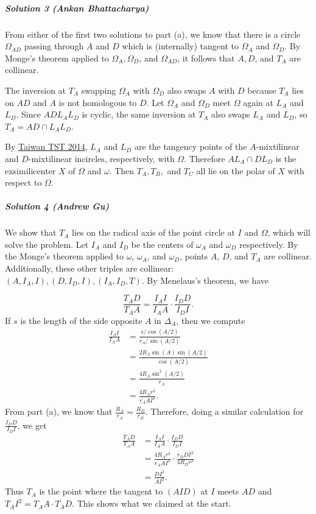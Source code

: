 \subparagraph{Solution 3 (Ankan Bhattacharya)}

From either of the first two solutions to part (a), we know that there is a
circle $\Omega_{AD}$ passing through $A$ and $D$ which is (internally) tangent
to $\Omega_A$ and $\Omega_D$. By Monge's theorem applied to $\Omega_A,
\Omega_D$, and $\Omega_{AD}$, it follows that $A, D$, and $T_A$ are collinear.

The inversion at $T_A$ swapping $\Omega_A$ with $\Omega_D$ also swaps $A$ with
$D$ because $T_A$ lies on $AD$ and $A$ is not homologous to $D$. Let $\Omega_A$
and $\Omega_D$ meet $\Omega$ again at $L_A$ and $L_D$. Since $ADL_AL_D$ is
cyclic, the same inversion at $T_A$ also swaps $L_A$ and $L_D$, so $T_A=AD\cap
L_AL_D$.

By \href{https://aops.com/community/c6h598547p3551881}{Taiwan TST
2014}, $L_A$ and $L_D$ are the tangency points of the $A$-mixtilinear and
$D$-mixtilinear incircles, respectively, with $\Omega$. Therefore $AL_A\cap
DL_D$ is the exsimilicenter $X$ of $\Omega$ and $\omega$. Then $T_A, T_B,$ and
$T_C$ all lie on the polar of $X$ with respect to $\Omega$.

\subparagraph{Solution 4 (Andrew Gu)}

We show that $T_A$ lies on the radical axis of the point circle at $I$ and
$\Omega$, which will solve the problem.  Let $I_A$ and $I_D$ be the centers of
$\omega_A$ and $\omega_D$ respectively. By the Monge's theorem applied to
$\omega$, $\omega_A$, and $\omega_D$, points $A$, $D$, and $T_A$ are collinear.
Additionally, these other triples are collinear: $(A, I_A, I), (D, I_D, I),
(I_A, I_D, T)$.  By Menelaus's theorem, we have

\[\frac{T_AD}{T_AA}=\frac{I_AI}{I_AA}\cdot\frac{I_DD}{I_DI}.\]
If $s$ is the length of the side opposite $A$ in $\Delta_A$, then we compute
\begin{align*}
  \frac{I_AI}{I_AA} &=\frac{s/\cos(A/2)}{r_A/\sin(A/2)} \\
                    &=\frac{2R_A\sin(A)\sin(A/2)}{\cos(A/2)} \\
                    &=\frac{4R_A\sin^2(A/2)}{r_A} \\
                    &=\frac{4R_Ar^2}{r_AAI^2}.
\end{align*}
From part (a), we know that $\frac{R_A}{r_A}=\frac{R_D}{r_D}$.
Therefore, doing a similar calculation for $\frac{I_DD}{I_DI}$, we get
\begin{align*}
  \frac{T_AD}{T_AA} &=\frac{I_AI}{I_AA}\cdot\frac{I_DD}{I_DI} \\
                    &=\frac{4R_Ar^2}{r_AAI^2}\cdot \frac{r_DDI^2}{4R_Dr^2} \\
                    &=\frac{DI^2}{AI^2}.
\end{align*}
Thus $T_A$ is the point where the tangent to $(AID)$ at $I$ meets $AD$ and
$T_AI^2=T_AA\cdot T_AD$. This shows what we claimed at the start.

